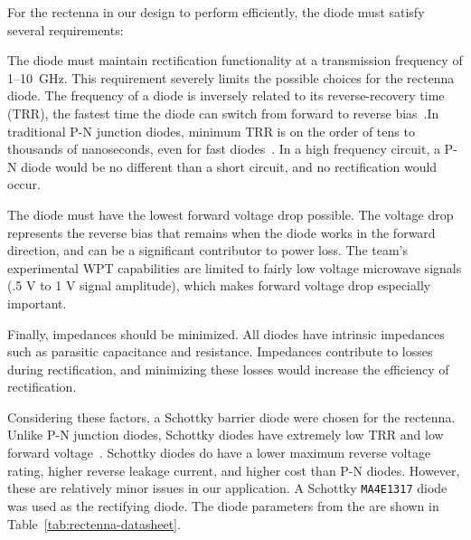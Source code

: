 For the rectenna in our design to perform efficiently, the diode must satisfy several requirements:

The diode must maintain rectification functionality at a transmission frequency of \numrange{1}{10}~GHz. This requirement severely limits the possible choices for the rectenna diode. The frequency of a diode is inversely related to its reverse-recovery time (TRR), the fastest time the diode can switch from forward to reverse bias~\cite{an1012-TRR}.In traditional P-N junction diodes, minimum TRR is on the order of tens to thousands of nanoseconds, even for fast diodes~\cite{davis2011schottky}. In a high frequency circuit, a P-N diode would be no different than a short circuit, and no rectification would occur.

The diode must have the lowest forward voltage drop possible. The voltage drop represents the reverse bias that remains when the diode works in the forward direction, and can be a significant contributor to power loss. The team's experimental WPT capabilities are limited to fairly low voltage microwave signals (.5 V to 1 V signal amplitude), which makes forward voltage drop especially important.

Finally, impedances should be minimized. All diodes have intrinsic impedances such as parasitic capacitance and resistance. Impedances contribute to losses during rectification, and minimizing these losses would increase the efficiency of rectification.

Considering these factors, a Schottky barrier diode were chosen for the rectenna. Unlike P-N junction diodes, Schottky diodes have extremely low TRR and low forward voltage~\cite{davis2011schottky}.  Schottky diodes do have a lower maximum reverse voltage rating, higher reverse leakage current, and higher cost than P-N diodes. However, these are relatively minor issues in our application. A Schottky \texttt{MA4E1317} diode was used as the rectifying diode. The diode parameters from the are shown in Table~\ref{tab:rectenna-datasheet}.

